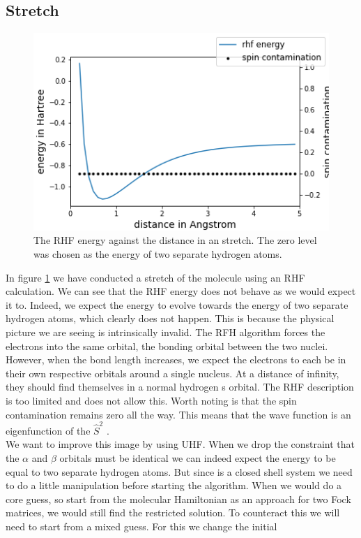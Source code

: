 \subsection{ Stretch}
\label{subsec:h2}
\begin{center}
  \begin{figure}[H]
    \centering
    \includegraphics[width=0.5\linewidth]{./img/rhf.png}
    \caption{The RHF energy against the distance in an  stretch. The zero level was chosen as the energy of two separate hydrogen atoms.}
    \label{fig:rhfstretch}
  \end{figure}
\end{center}
In figure \ref{fig:rhfstretch} we have conducted a stretch of the  molecule using an RHF calculation.
We can see that the RHF energy does not behave as we would expect it to. Indeed, we expect the energy to evolve towards the energy of two separate hydrogen atoms, which clearly does
not happen. This is because the physical picture we are seeing is intrinsically invalid. The RFH algorithm forces the electrons into the same orbital, the bonding orbital between
the two nuclei. However, when the bond length increases, we expect the electrons to each be in their own respective orbitals around a single nucleus. At a distance of infinity, they
should find themselves in a normal hydrogen s orbital. The RHF description is too limited and does not allow this. Worth noting is that the spin contamination remains zero all the 
way. This means that the wave function is an eigenfunction of the $\hat{S}^2$ \cite{Scuseria2011}. \\
We want to improve this image by using UHF.  When we drop the constraint that the $\alpha$ and $\beta$ orbitals must be identical we can indeed expect the energy to be equal to two separate hydrogen atoms.
But since  is a closed shell system we need to do a little manipulation before starting the algorithm. When we would do a core guess, so start from the molecular
Hamiltonian as an approach for two Fock matrices, we would still find the restricted solution. To counteract this we will need to start from a mixed guess. For this we change the initial
